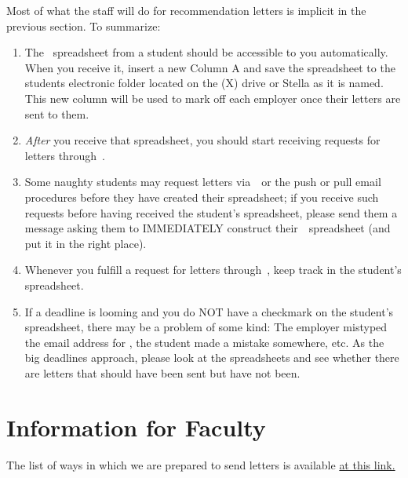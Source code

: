 \documentclass{\econtex}
\begin{document}
\begin{enumerate}
  Most of what the staff will do for recommendation letters is implicit in the previous section.  To
  summarize:
  \begin{enumerate}
  \item The \EMtt~spreadsheet from a student should be accessible to you automatically.  When you receive it, insert a new Column A and save the spreadsheet to the students electronic folder located on the (X) drive or Stella as it is named. This new column will be used to mark off each employer once their letters are sent to them.
  \item \textit{After} you receive that spreadsheet, you should start receiving requests for letters through~\jmstaffemail.  
  \item Some naughty students may request letters via~\EJM~or the push or pull email procedures before they have created their spreadsheet; if you receive such requests before having received the student's spreadsheet, please send them a message asking them to IMMEDIATELY construct their~{\EMtt}~spreadsheet (and put it in the right place).
  \item Whenever you fulfill a request for letters through~\jmstaffemail, keep track in the student's spreadsheet.
  \item If a deadline is looming and you do NOT have a checkmark on the student's spreadsheet, there may be a problem of some kind: The employer mistyped the email address for \jmstaffemail, the student made a mistake somewhere, etc.  As the big deadlines approach, please look at the spreadsheets and see whether there are letters that should have been sent but have not been.
  \end{enumerate}
\end{enumerate}

\hypertarget{information-for-faculty}{}

\section{Information for Faculty}%

The list of ways in which we are prepared to send letters is available {\href{\pageurl/RecLetters/#students-and-staff}{at this link.}}
\end{document}
